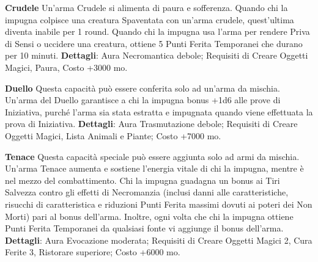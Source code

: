 \documentclass[a4paper,twoside,openany]{book}
\begin{document}
\smallskip* \textbf{Crudele}\hypertarget{Crudele}{}
Un'arma Crudele si alimenta di paura e sofferenza. Quando chi la impugna colpisce una creatura Spaventata con un'arma crudele, quest'ultima diventa inabile per 1 round. Quando chi la impugna usa l'arma per rendere Priva di Sensi o uccidere una creatura, ottiene 5 Punti Ferita Temporanei che durano per 10 minuti.
\textbf{Dettagli}: Aura Necromantica debole; Requisiti di Creare Oggetti Magici, Paura, Costo +3000 mo.


\smallskip* \textbf{Duello}\hypertarget{Duello}{}
Questa capacità può essere conferita solo ad un'arma da mischia. Un'arma del Duello garantisce a chi la impugna bonus +1d6 alle prove di Iniziativa, purché l'arma sia stata estratta e impugnata quando viene effettuata la prova di Iniziativa.
\textbf{Dettagli}: Aura Trasmutazione debole; Requisiti di Creare Oggetti Magici, Lista Animali e Piante; Costo +7000 mo.


\smallskip* \textbf{Tenace}\hypertarget{Tenace}{}
Questa capacità speciale può essere aggiunta solo ad armi da mischia. Un'arma Tenace aumenta e sostiene l'energia vitale di chi la impugna, mentre è nel mezzo del combattimento. Chi la impugna guadagna un bonus ai Tiri Salvezza contro gli effetti di Necromanzia (inclusi danni alle caratteristiche, risucchi di caratteristica e riduzioni Punti Ferita massimi dovuti ai poteri dei Non Morti) pari al bonus dell'arma. Inoltre, ogni volta che chi la impugna ottiene Punti Ferita Temporanei da qualsiasi fonte vi aggiunge il bonus dell'arma.
\textbf{Dettagli}: Aura Evocazione moderata; Requisiti di Creare Oggetti Magici 2, Cura Ferite 3, Ristorare superiore; Costo +6000 mo.




{\scriptsize\printindex}
\end{document}
